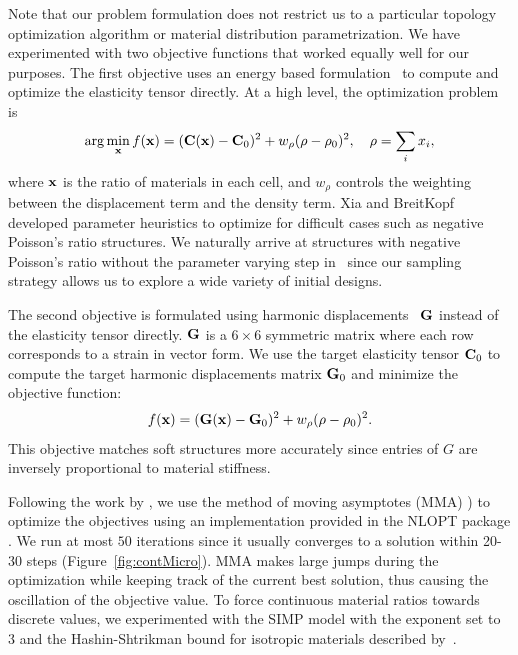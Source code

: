 Note that our problem formulation does not restrict us to a particular topology optimization algorithm or material distribution parametrization. We have experimented with two objective functions that worked equally well for our purposes.
The first objective uses an energy based formulation~\cite{xia:2015:design} to compute and optimize the elasticity tensor directly. At a high level, the optimization problem is
\begin{equation}
\arg\min_{\mathbf{x}} f(\mathbf{x}) = (\mathbf{C}(\mathbf{x})-\mathbf{C}_0)^2 + w_{\rho}(\rho-\rho_0)^2, \quad \rho = \sum_{i} x_{i} ,
\end{equation}
where $\mathbf{x}$ is the ratio of materials in each cell, and $w_{\rho}$ controls the weighting between the displacement term and the density term.
Xia and BreitKopf developed parameter heuristics to optimize for difficult cases such as negative Poisson's ratio structures. We naturally arrive at structures with negative Poisson's ratio without the parameter varying step in~\cite{xia:2015:design} since our sampling strategy allows us to explore a wide variety of initial designs.

The second objective is formulated using harmonic displacements~\citep{Kharevych2009,Schumacher:2015} $\mathbf{G}$ instead of the elasticity tensor directly. $\mathbf{G}$ is a $6\times 6$ symmetric matrix where each row corresponds to a strain in vector form. We use the target elasticity tensor $\mathbf{C}_0$ to compute the target harmonic displacements matrix $\mathbf{G}_0$ and minimize the objective function:
\begin{equation}
f(\mathbf{x}) = (\mathbf{G}(\mathbf{x})-\mathbf{G}_0)^2 + w_{\rho}(\rho-\rho_0)^2.
\end{equation}
This objective matches soft structures more accurately since entries of $G$ are inversely proportional to material stiffness.

Following the work by \citet{andreassen2014design}, we use the method of moving asymptotes (MMA) \cite{svanberg1987method}) to optimize the objectives using an implementation provided in the NLOPT package \citep{johnson2014nlopt}. We run at most $50$ iterations since it usually converges to a solution within 20-30 steps (Figure~\ref{fig:contMicro}).
MMA makes large jumps during the optimization while keeping track of the current best solution, thus causing the oscillation of the objective value.
To force continuous material ratios towards discrete values, we experimented with the SIMP model with the exponent set to $3$ and the Hashin-Shtrikman bound for isotropic materials
described by~\citet{bendsoe1999material}.

